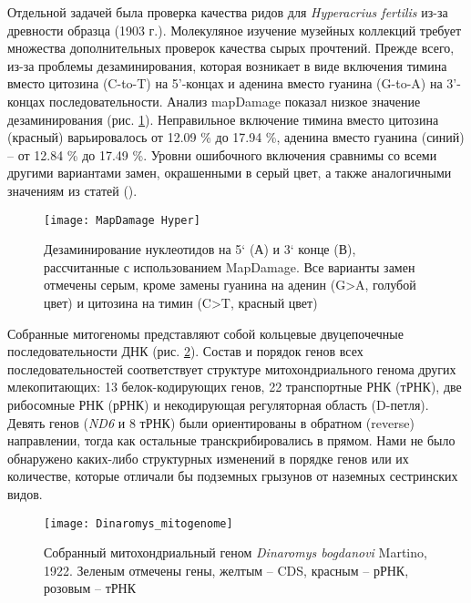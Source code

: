 Отдельной задачей была проверка качества ридов для \textit{Hyperacrius fertilis} из-за древности образца (1903 г.). Молекуляное изучение музейных коллекций требует множества дополнительных проверок качества сырых прочтений. Прежде всего, из-за проблемы дезаминирования, которая возникает в виде включения тимина вместо цитозина (C-to-T) на 5'-концах и аденина вместо гуанина (G-to-A) на 3'-концах последовательности. Анализ mapDamage показал низкое значение дезаминирования (рис. \ref{MapDamage}). Неправильное включение тимина вместо цитозина (красный) варьировалось от 12.09 \% до 17.94 \%, аденина вместо гуанина (синий) -- от 12.84 \% до 17.49 \%. Уровни ошибочного включения сравнимы со всеми другими вариантами замен, окрашенными в серый цвет, а также аналогичными значениям из статей (\cite{Molto2017}).


\begin{figure}[h!]
	\begin{center}
		\texttt{[image: MapDamage Hyper]}
	\end{center}
	\caption{Дезаминирование нуклеотидов на 5` (А) и 3` конце (В), рассчитанные с использованием MapDamage. Все варианты замен отмечены серым, кроме замены гуанина на аденин (G>A, голубой цвет) и цитозина на тимин (C>T, красный цвет)}\label{MapDamage}
\end{figure}


Собранные митогеномы представляют собой кольцевые двуцепочечные последовательности ДНК (рис. \ref{mitogenome}). Состав и порядок генов всех последовательностей соответствует структуре митохондриального генома других млекопитающих: 13 белок-кодирующих генов, 22 транспортные РНК (тРНК), две рибосомные РНК (рРНК) и некодирующая регуляторная область (D-петля). Девять генов (\textit{ND6} и 8 тРНК) были ориентированы в обратном (reverse) направлении, тогда как остальные транскрибировались в прямом. Нами не было обнаружено каких-либо структурных изменений в порядке генов или их количестве, которые отличали бы подземных грызунов от наземных сестринских видов.

\begin{figure}[h!]
	\begin{center}
		\texttt{[image: Dinaromys\_mitogenome]}
	\end{center}
	\caption{Собранный митохондриальный геном \textit{Dinaromys bogdanovi} Martino, 1922. Зеленым отмечены гены, желтым -- CDS, красным -- рРНК, розовым -- тРНК}\label{mitogenome}
\end{figure}

